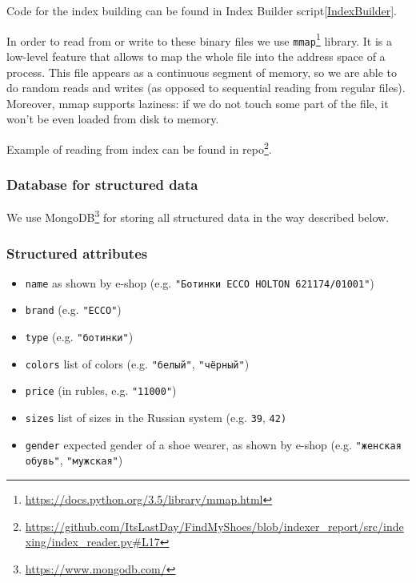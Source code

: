 Code for the index building can be found in Index Builder script\cref{IndexBuilder}.

In order to read from or write to these binary files we use \texttt{mmap}\footnote{\url{https://docs.python.org/3.5/library/mmap.html}} library. 
It is a low-level feature that allows to map the whole file into the address space of a process. This file appears as a continuous segment of memory, so we are able to do random reads and writes (as opposed to sequential reading from regular files). Moreover, mmap supports laziness: if we do not touch some part of the file, it won't be even loaded from disk to memory.

Example of reading from index can be found in repo\footnote{\url{https://github.com/ItsLastDay/FindMyShoes/blob/indexer_report/src/indexing/index_reader.py\#L17}}.

\subsubsection{Database for structured data}
We use MongoDB\footnote{\label{mongo}\url{https://www.mongodb.com/}} for storing all structured data in the way described below.

\subsubsection{Structured attributes}
\begin{itemize}
    \item \texttt{name} as shown by e-shop (e.g. \newline \texttt{"Ботинки ECCO HOLTON 621174/01001"})
    \item \texttt{brand} (e.g. \texttt{"ECCO"})
    \item \texttt{type} (e.g. \texttt{"ботинки"})
    \item \texttt{colors} list of colors (e.g. \texttt{"белый"}, \texttt{"чёрный"})
    \item \texttt{price} (in rubles, e.g. \texttt{"11000"})
    \item \texttt{sizes} list of sizes in the Russian system (e.g. \texttt{39}, \texttt{42)}
    \item \texttt{gender} expected gender of a shoe wearer, as shown by e-shop (e.g. \texttt{"женская обувь"}, \texttt{"мужская"})
\end{itemize}

